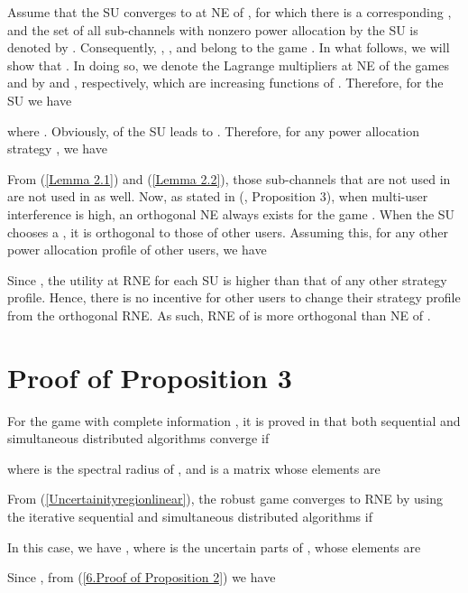 \documentclass[peerreview,onecolumn,11pt,draftclsnofoot]{IEEEtran}\usepackage{amsmath}\usepackage{amsfonts}\usepackage{epsfig}\usepackage{amssymb}\usepackage{graphicx}\usepackage{amssymb,amsmath}\usepackage{cite}\usepackage{color,soul}\newcommand\T{\rule{0pt}{3.1ex}}
\begin{document}
Assume that the  SU converges to  at NE of
, for which there is a corresponding , and the set of all sub-channels with nonzero power allocation by the  SU is denoted by . Consequently,
,
, and
 belong to the game
. In what follows, we will show that
. In doing so, we denote the Lagrange multipliers at NE of the games
 and  by  and , respectively, which are
increasing functions of . Therefore, for the  SU we have

where . Obviously,  of the  SU leads to . Therefore, for any power allocation strategy , we have

From (\ref{Lemma 2.1}) and (\ref{Lemma 2.2}), those sub-channels that are not used in  are not used in
 as well. Now, as stated in (\!\!\cite{Nash1}, Proposition 3), when
multi-user interference is high, an orthogonal NE always exists
for the game . When the  SU chooses a , it is orthogonal to those of other users. Assuming this, for any other power allocation profile of other users, we have

Since , the utility at RNE for each SU is higher than that of any other strategy profile. Hence, there is no incentive for other users to change their strategy profile from the orthogonal RNE. As such, RNE of  is more orthogonal than NE of .
\section{Proof of Proposition 3}
For the game with complete information , it is proved in \cite{Nash2} that both sequential and simultaneous distributed algorithms converge if

where  is the spectral radius of
, and  is a  matrix whose elements are

From (\ref{Uncertainityregionlinear}), the robust game
 converges to RNE by using the iterative sequential and simultaneous distributed algorithms if

In this case, we have , where  is the uncertain parts of , whose elements are

Since , from (\ref{6.Proof of Proposition 2}) we have




\end{document}
